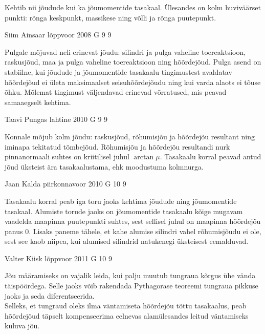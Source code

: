 \documentclass[11pt]{article}
\begin{document}
{{\ifHint
Kehtib nii jõudude kui ka jõumomentide tasakaal. Ülesandes on kolm huviväärset punkti: rõnga keskpunkt, massikese ning võlli ja rõnga puutepunkt.
\fi
}

{Siim Ainsaar} %
{lõppvoor} %
{2008} %
{G 9} %
{9} %
{

\ifHint
Pulgale mõjuvad neli erinevat jõudu: silindri ja pulga vaheline toereaktsioon, raskusjõud, maa ja pulga vaheline toereaktsioon ning hõõrdejõud. Pulga asend on stabiilne, kui jõudude ja jõumomentide tasakaalu tingimustest avaldatav hõõrdejõud ei ületa maksimaalset seisuhõõrdejõudu ning kui varda alaots ei tõuse õhku. Mõlemat tingimust väljendavad erinevad võrratused, mis peavad samaaegselt kehtima.
\fi
}

{Taavi Pungas} %
{lahtine} %
{2010} %
{G 9} %
{9} %
{

\ifHint
Konnale mõjub kolm jõudu: raskusjõud, rõhumisjõu ja hõõrdejõu resultant ning iminapa tekitatud tõmbejõud. Rõhumisjõu ja hõõrdejõu resultandi nurk pinnanormaali suhtes on kriitilisel juhul $\arctan \mu$. Tasakaalu korral peavad antud jõud üksteist ära tasakaalustama, ehk moodustuma kolmnurga.
\fi
}

{Jaan Kalda} %
{piirkonnavoor} %
{2010} %
{G 10} %
{9} %
{

\ifHint
Tasakaalu korral peab iga toru jaoks kehtima jõudude ning jõumomentide tasakaal. Alumiste torude jaoks on jõumomentide tasakaalu kõige mugavam vaadelda maapinna puutepunkti suhtes, sest sellisel juhul on maapinna hõõrdejõu panus \num{0}. Lisaks paneme tähele, et kahe alumise silindri vahel rõhumisjõudu ei ole, sest see kaob niipea, kui alumised silindrid natukenegi üksteisest eemalduvad.
\fi
}

{Valter Kiisk} %
{lõppvoor} %
{2011} %
{G 10} %
{9} %
{

\ifHint
\osa Jõu määramiseks on vajalik leida, kui palju muutub tungraua kõrgus ühe vända täispöördega. Selle jaoks võib rakendada Pythagorase teoreemi tungraua pikkuse jaoks ja seda diferentseerida.\\
\osa Selleks, et tungraud oleks ilma väntamiseta hõõrdejõu tõttu tasakaalus, peab hõõrdejõud täpselt kompenseerima eelnevas alamülesandes leitud väntamiseks kuluva jõu.
\fi
}

}
\end{document}
